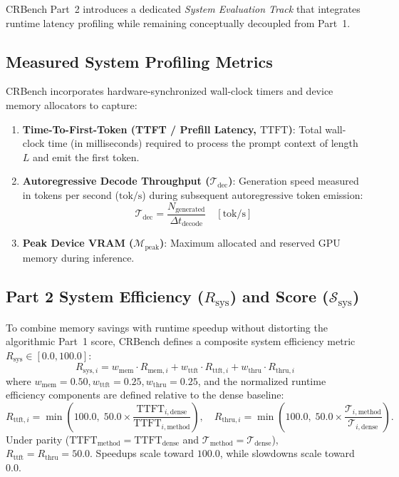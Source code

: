 \documentclass[11pt,a4paper]{article}
\begin{document}
CRBench Part~2 introduces a dedicated \textit{System Evaluation Track} that integrates runtime latency profiling while remaining conceptually decoupled from Part~1.

\subsection{Measured System Profiling Metrics}
CRBench incorporates hardware-synchronized wall-clock timers and device memory allocators to capture:
\begin{enumerate}[leftmargin=*]
    \item \textbf{Time-To-First-Token (TTFT / Prefill Latency, $\text{TTFT}$)}: Total wall-clock time (in milliseconds) required to process the prompt context of length $L$ and emit the first token.
    \item \textbf{Autoregressive Decode Throughput ($\mathcal{T}_{\text{dec}}$)}: Generation speed measured in tokens per second ($\text{tok/s}$) during subsequent autoregressive token emission:
    \begin{equation}
    \label{eq:throughput}
    \boxed{
    \mathcal{T}_{\text{dec}} = \frac{N_{\text{generated}}}{\Delta t_{\text{decode}}} \quad [\text{tok/s}]
    }
    \end{equation}
    \item \textbf{Peak Device VRAM ($\mathcal{M}_{\text{peak}}$)}: Maximum allocated and reserved GPU memory during inference.
\end{enumerate}

\subsection{Part 2 System Efficiency ($R_{\text{sys}}$) and Score ($\mathcal{S}_{\text{sys}}$)}
To combine memory savings with runtime speedup without distorting the algorithmic Part~1 score, CRBench defines a composite system efficiency metric $R_{\text{sys}} \in [0.0, 100.0]$:
\begin{equation}
\label{eq:rsys}
\boxed{
R_{\text{sys}, i} = w_{\text{mem}} \cdot R_{\text{mem}, i} + w_{\text{ttft}} \cdot R_{\text{ttft}, i} + w_{\text{thru}} \cdot R_{\text{thru}, i}
}
\end{equation}
where $w_{\text{mem}} = 0.50, w_{\text{ttft}} = 0.25, w_{\text{thru}} = 0.25$, and the normalized runtime efficiency components are defined relative to the dense baseline:
\begin{equation}
\boxed{
R_{\text{ttft}, i} = \min\left(100.0, \; 50.0 \times \frac{\text{TTFT}_{i, \text{dense}}}{\text{TTFT}_{i, \text{method}}}\right)
}, \quad
\boxed{
R_{\text{thru}, i} = \min\left(100.0, \; 50.0 \times \frac{\mathcal{T}_{i, \text{method}}}{\mathcal{T}_{i, \text{dense}}}\right)
}.
\end{equation}
Under parity ($\text{TTFT}_{\text{method}} = \text{TTFT}_{\text{dense}}$ and $\mathcal{T}_{\text{method}} = \mathcal{T}_{\text{dense}}$), $R_{\text{ttft}} = R_{\text{thru}} = 50.0$. Speedups scale toward $100.0$, while slowdowns scale toward $0.0$.
\end{document}

